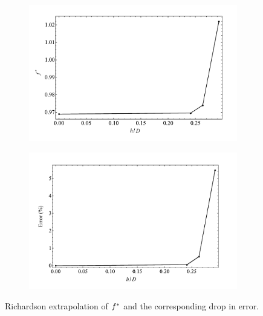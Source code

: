 \documentclass[oneside]{utmthesis}
\begin{document}
\begin{figure}
  \centering
  \begin{subfigure}[h]{1\textwidth}
    \includegraphics[width=\textwidth]{figs/gciFstr-1}
    \caption{}
    \label{fig:gciFstr-1}
  \end{subfigure}

  \begin{subfigure}[h]{1\textwidth}
    \includegraphics[width=\textwidth]{figs/gciFstr-2}
    \caption{}
    \label{fig:gciFstr-2}
  \end{subfigure}
  \caption{Richardson extrapolation of $f^{*}$ and the corresponding drop in error.} \label{fig:gciFstr}
\end{figure}
\end{document}
